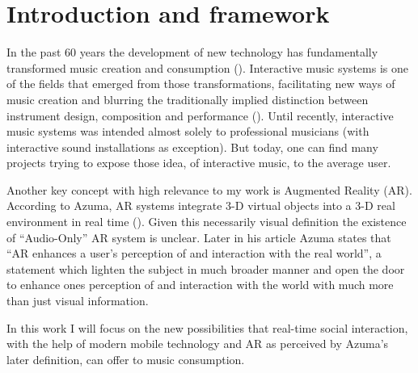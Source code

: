 \section{Introduction and framework}


In the past 60 years the development of new technology has fundamentally transformed music creation and consumption (\cite[]{winkler01}).
Interactive music systems is one of the fields that emerged from those transformations, facilitating new ways of music creation and blurring the traditionally implied distinction between instrument design, composition and performance (\cite{drummond09}).
Until recently, interactive music systems was intended almost solely to professional musicians (with interactive sound installations as exception).
But today, one can find many projects trying to expose those idea, of interactive music, to the average user.

Another key concept with high relevance to my work is Augmented Reality (AR). According to Azuma, AR systems integrate 3-D virtual objects into a 3-D real environment in real time (\cite*{azuma97}).
Given this necessarily visual definition the existence of ``Audio-Only'' AR system is unclear.
Later in his article Azuma states that ``AR enhances a user's perception of and interaction with the real world'', a statement which lighten the subject in much broader manner and open the door to enhance ones perception of and interaction with the world with much more than just visual information.

In this work I will focus on the new possibilities that real-time social interaction, with the help of modern mobile technology and AR as perceived by Azuma's later definition, can offer to music consumption.